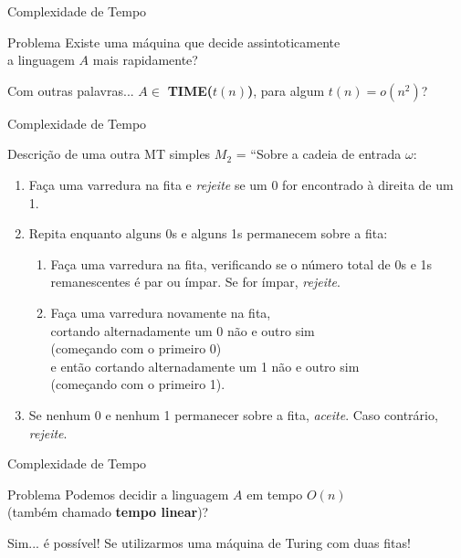\documentclass[xcolor=dvipsnames,table]{beamer}
\begin{document}
	\begin{frame}{Complexidade de Tempo}
		\begin{block}{Problema}
			Existe uma máquina que decide assintoticamente \\a linguagem $A$ mais rapidamente?
		\end{block}
		\begin{block}{Com outras palavras...}
			$A \in$ {\bf TIME($t(n)$)}, para algum $t(n) = o(n^2)$?
		\end{block}
	\end{frame}
	
	\begin{frame}[shrink]{Complexidade de Tempo}
		\begin{block}{Descrição de uma outra MT simples}
			$M_2$ = ``Sobre a cadeia de entrada $\omega$:
			\begin{enumerate}
				\item Faça uma varredura na fita e {\it rejeite} se um 0 for encontrado à direita de um 1.
				\item Repita enquanto alguns 0s e alguns 1s permanecem sobre a fita:
				\begin{enumerate}
					\item Faça uma varredura na fita, verificando se o número total de 0s e 1s remanescentes é par ou ímpar. Se for ímpar, {\it rejeite}.
					\item Faça uma varredura novamente na fita, \\cortando alternadamente um 0 não e outro sim \\(começando com o primeiro 0) \\e então cortando alternadamente um 1 não e outro sim \\(começando com o primeiro 1).
				\end{enumerate}
				\item Se nenhum 0 e nenhum 1 permanecer sobre a fita, {\it aceite}. Caso contrário, {\it rejeite}.
			\end{enumerate}
		\end{block}
	\end{frame}
	
	\begin{frame}{Complexidade de Tempo}
		\begin{block}{Problema}
			Podemos decidir a linguagem $A$ em tempo $O(n)$ \\(também chamado {\bf tempo linear})?
		\end{block}
		\begin{exampleblock}{Sim... é possível!}
			Se utilizarmos uma máquina de Turing com duas fitas!
		\end{exampleblock}
	\end{frame}
	
\end{document}
